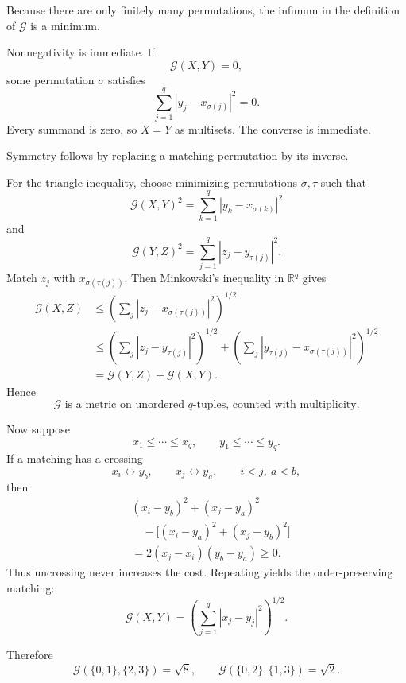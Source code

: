 \begin{solution}
Because there are only finitely many permutations, the infimum in the definition of
\(\mathcal G\) is a minimum.

Nonnegativity is immediate. If
\[
\mathcal G(X,Y)=0,
\]
some permutation \(\sigma\) satisfies
\[
\sum_{j=1}^q|y_j-x_{\sigma(j)}|^2=0.
\]
Every summand is zero, so \(X=Y\) as multisets. The converse is immediate.

Symmetry follows by replacing a matching permutation by its inverse.

For the triangle inequality, choose minimizing permutations \(\sigma,\tau\) such that
\[
\mathcal G(X,Y)^2
=
\sum_{k=1}^q|y_k-x_{\sigma(k)}|^2
\]
and
\[
\mathcal G(Y,Z)^2
=
\sum_{j=1}^q|z_j-y_{\tau(j)}|^2.
\]
Match \(z_j\) with \(x_{\sigma(\tau(j))}\). Then Minkowski's inequality in
\(\mathbb R^q\) gives
\[
\begin{aligned}
\mathcal G(X,Z)
&\le
\left(
\sum_j|z_j-x_{\sigma(\tau(j))}|^2
\right)^{1/2}\\
&\le
\left(
\sum_j|z_j-y_{\tau(j)}|^2
\right)^{1/2}
+
\left(
\sum_j|y_{\tau(j)}-x_{\sigma(\tau(j))}|^2
\right)^{1/2}\\
&=
\mathcal G(Y,Z)+\mathcal G(X,Y).
\end{aligned}
\]
Hence
\[
\boxed{\mathcal G\text{ is a metric on unordered \(q\)-tuples, counted with multiplicity}.}
\]

Now suppose
\[
x_1\le\cdots\le x_q,
\qquad
y_1\le\cdots\le y_q.
\]
If a matching has a crossing
\[
x_i\leftrightarrow y_b,
\qquad
x_j\leftrightarrow y_a,
\qquad
i<j,\ a<b,
\]
then
\[
\begin{aligned}
&(x_i-y_b)^2+(x_j-y_a)^2\\
&\quad-
\bigl[(x_i-y_a)^2+(x_j-y_b)^2\bigr]\\
&=
2(x_j-x_i)(y_b-y_a)\ge0.
\end{aligned}
\]
Thus uncrossing never increases the cost. Repeating yields the order-preserving matching:
\[
\boxed{
\mathcal G(X,Y)
=
\left(
\sum_{j=1}^q|x_j-y_j|^2
\right)^{1/2}.
}
\]

Therefore
\[
\mathcal G(\{0,1\},\{2,3\})=\sqrt8,
\qquad
\mathcal G(\{0,2\},\{1,3\})=\sqrt2.
\]
\end{solution}


